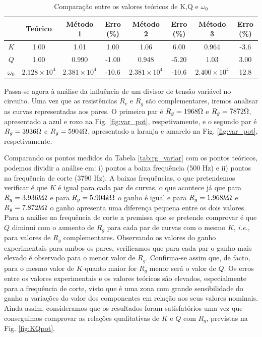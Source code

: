 \begin{table}[ht]
    \centering
    \caption{Comparação entre os valores teóricos de K,Q e $\omega_0$}
    \begin{tabular}{cccccccc}
    \hline
         & Teórico & Método 1 & Erro (\%) & Método 2 & Erro (\%) & Método 3 &Erro (\%)\\
        \hline
        $K$   & 1.00 & 1.01 &  1.00  & 1.06 & 6.00 & 0.964 & -3.6 \\
        $Q$   & 1.00 & 0.990 & -1.00 & 0.948 & -5.20 & 1.03 & 3.00 \\
        $\omega_0$   & $2.128 \times 10^4$ & $2.381 \times 10^4$ & -10.6 & $2.381 \times 10^4$ & -10.6 & $2.400 \times 10^4$ & 12.8  \\
    \hline
    \end{tabular}
    \label{tab:comparação_resultados}
\end{table}

Passa-se agora à análise da influência de um divisor de tensão variável no circuito. Uma vez que as resistências $R_v$ e $R_g$ são complementares, iremos analisar as curvas representadas aos pares. O primeiro par é $R_g=1968 \ohm$  e $R_g=7872 \ohm$, apresentado a azul e roxo na Fig. \ref{fig:var_pot}, respetivamente, e o segundo par é $R_g=3936\ohm$ e $R_g=5904 \ohm$, apresentado a laranja e amarelo na Fig. \ref{fig:var_pot}, respetivamente. 

Comparando os pontos medidos da Tabela \ref{tab:rg_variar} com os pontos teóricos, podemos dividir a análise em: i) pontos a baixa frequência (500 Hz) e ii) pontos na frequência de corte (3790 Hz). A baixas frequências, o que pretendemos verificar é que $K$ é igual para cada par de curvas, o que acontece já que para $R_g=3.936 k\ohm$ e para $R_g = 5.904 k\ohm$ o ganho é igual e para $R_g=1.968 k\ohm$ e $R_g=7.872 k\ohm$ o ganho apresenta uma diferença pequena entre os dois valores. Para a análise na frequência de corte a premissa que se pretende comprovar é que $Q$ diminui com o aumento de $R_g$ para cada par de curvas com o mesmo $K$, \textit{i.e.}, para valores de $R_g$ complementares. Observando os valores do ganho experimentais para ambos os pares, verificamos que para cada par o ganho mais elevado é observado para o menor valor de $R_g$. Confirma-se assim que, de facto, para o mesmo valor de $K$ quanto maior for $R_g$ menor será o valor de $Q$. Os erros entre os valores experimentais e os valores teóricos são elevados, especialmente para a frequência de corte, visto que é uma zona com grande sensibilidade do ganho a variações do valor dos componentes em relação aos seus valores nominais. Ainda assim, consideramos que os resultados foram satisfatórios uma vez que conseguimos comprovar as relações qualitativas de $K$ e $Q$ com $R_g$, previstas na Fig. \ref{fig:KQpot}. 

